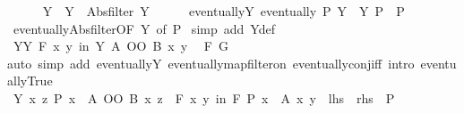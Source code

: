 \begin{isabellebody}
\isanewline
\ \ \ \ \isamarkupfalse%
\ Y\ \ {\isachardoublequoteopen}Y\ {\isacharequal}{\kern0pt}\ Abs{\isacharunderscore}{\kern0pt}filter\ {\isacharquery}{\kern0pt}Y{\isachardoublequoteclose}\isanewline
\ \ \ \ \isamarkupfalse%
\ eventually{\isacharunderscore}{\kern0pt}Y{\isacharcolon}{\kern0pt}\ {\isachardoublequoteopen}eventually\ P\ Y\ {\isasymlongleftrightarrow}\ {\isacharquery}{\kern0pt}Y\ P{\isachardoublequoteclose}\ \ P\isanewline
\ \ \ \ \ \ \isamarkupfalse%
\ eventually{\isacharunderscore}{\kern0pt}Abs{\isacharunderscore}{\kern0pt}filter{\isacharbrackleft}{\kern0pt}OF\ Y{\isacharcomma}{\kern0pt}\ of\ P{\isacharbrackright}{\kern0pt}\ \isamarkupfalse%
{\isacharparenleft}{\kern0pt}simp\ add{\isacharcolon}{\kern0pt}\ Y{\isacharunderscore}{\kern0pt}def{\isacharparenright}{\kern0pt}\isanewline
\ \ \ \ \isamarkupfalse%
\ YY{\isacharcolon}{\kern0pt}\ {\isachardoublequoteopen}{\isasymforall}\isactrlsub F\ {\isacharparenleft}{\kern0pt}x{\isacharcomma}{\kern0pt}\ y{\isacharparenright}{\kern0pt}\ in\ Y{\isachardot}{\kern0pt}\ {\isacharparenleft}{\kern0pt}A\ OO\ B{\isacharparenright}{\kern0pt}\ x\ y{\isachardoublequoteclose}\ \isamarkupfalse%
\ F\ G\isanewline
\ \ \ \ \ \ \isamarkupfalse%
{\isacharparenleft}{\kern0pt}auto\ simp\ add{\isacharcolon}{\kern0pt}\ eventually{\isacharunderscore}{\kern0pt}Y\ eventually{\isacharunderscore}{\kern0pt}map{\isacharunderscore}{\kern0pt}filter{\isacharunderscore}{\kern0pt}on\ eventually{\isacharunderscore}{\kern0pt}conj{\isacharunderscore}{\kern0pt}iff\ intro{\isacharbang}{\kern0pt}{\isacharcolon}{\kern0pt}\ eventually{\isacharunderscore}{\kern0pt}True{\isacharparenright}{\kern0pt}\isanewline
\ \ \ \ \isamarkupfalse%
\ {\isachardoublequoteopen}{\isacharquery}{\kern0pt}Y\ {\isacharparenleft}{\kern0pt}{\isasymlambda}{\isacharparenleft}{\kern0pt}x{\isacharcomma}{\kern0pt}\ z{\isacharparenright}{\kern0pt}{\isachardot}{\kern0pt}\ P\ x\ {\isasymand}\ {\isacharparenleft}{\kern0pt}A\ OO\ B{\isacharparenright}{\kern0pt}\ x\ z{\isacharparenright}{\kern0pt}\ {\isasymlongleftrightarrow}\ {\isacharparenleft}{\kern0pt}{\isasymforall}\isactrlsub F\ {\isacharparenleft}{\kern0pt}x{\isacharcomma}{\kern0pt}\ y{\isacharparenright}{\kern0pt}\ in\ F{\isachardot}{\kern0pt}\ P\ x\ {\isasymand}\ A\ x\ y{\isacharparenright}{\kern0pt}{\isachardoublequoteclose}\ {\isacharparenleft}{\kern0pt}\ {\isachardoublequoteopen}{\isacharquery}{\kern0pt}lhs\ {\isacharequal}{\kern0pt}\ {\isacharquery}{\kern0pt}rhs{\isachardoublequoteclose}{\isacharparenright}{\kern0pt}\ \ P\isanewline

\end{isabellebody}
